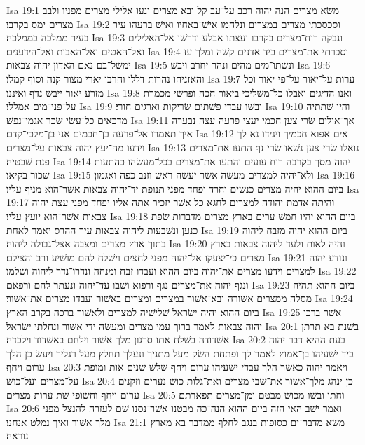 Isa 19:1  משׂא מצרים הנה יהוה רכב על־עב קל ובא מצרים ונעו אלילי מצרים מפניו ולבב מצרים ימס בקרבו׃
Isa 19:2  וסכסכתי מצרים במצרים ונלחמו אישׁ־באחיו ואישׁ ברעהו עיר בעיר ממלכה בממלכה׃
Isa 19:3  ונבקה רוח־מצרים בקרבו ועצתו אבלע ודרשׁו אל־האלילים ואל־האטים ואל־האבות ואל־הידענים׃
Isa 19:4  וסכרתי את־מצרים ביד אדנים קשׁה ומלך עז ימשׁל־בם נאם האדון יהוה צבאות׃
Isa 19:5  ונשׁתו־מים מהים ונהר יחרב ויבשׁ׃
Isa 19:6  והאזניחו נהרות דללו וחרבו יארי מצור קנה וסוף קמלו׃
Isa 19:7  ערות על־יאור על־פי יאור וכל מזרע יאור ייבשׁ נדף ואיננו׃
Isa 19:8  ואנו הדיגים ואבלו כל־משׁליכי ביאור חכה ופרשׂי מכמרת על־פני־מים אמללו׃
Isa 19:9  ובשׁו עבדי פשׁתים שׂריקות וארגים חורי׃
Isa 19:10  והיו שׁתתיה מדכאים כל־עשׂי שׂכר אגמי־נפשׁ׃
Isa 19:11  אך־אולים שׂרי צען חכמי יעצי פרעה עצה נבערה איך תאמרו אל־פרעה בן־חכמים אני בן־מלכי־קדם׃
Isa 19:12  אים אפוא חכמיך ויגידו נא לך וידעו מה־יעץ יהוה צבאות על־מצרים׃
Isa 19:13  נואלו שׂרי צען נשׁאו שׂרי נף התעו את־מצרים פנת שׁבטיה׃
Isa 19:14  יהוה מסך בקרבה רוח עועים והתעו את־מצרים בכל־מעשׂהו כהתעות שׁכור בקיאו׃
Isa 19:15  ולא־יהיה למצרים מעשׂה אשׁר יעשׂה ראשׁ וזנב כפה ואגמון׃
Isa 19:16  ביום ההוא יהיה מצרים כנשׁים וחרד ופחד מפני תנופת יד־יהוה צבאות אשׁר־הוא מניף עליו׃
Isa 19:17  והיתה אדמת יהודה למצרים לחגא כל אשׁר יזכיר אתה אליו יפחד מפני עצת יהוה צבאות אשׁר־הוא יועץ עליו׃
Isa 19:18  ביום ההוא יהיו חמשׁ ערים בארץ מצרים מדברות שׂפת כנען ונשׁבעות ליהוה צבאות עיר ההרס יאמר לאחת׃
Isa 19:19  ביום ההוא יהיה מזבח ליהוה בתוך ארץ מצרים ומצבה אצל־גבולה ליהוה׃
Isa 19:20  והיה לאות ולעד ליהוה צבאות בארץ מצרים כי־יצעקו אל־יהוה מפני לחצים וישׁלח להם מושׁיע ורב והצילם׃
Isa 19:21  ונודע יהוה למצרים וידעו מצרים את־יהוה ביום ההוא ועבדו זבח ומנחה ונדרו־נדר ליהוה ושׁלמו׃
Isa 19:22  ונגף יהוה את־מצרים נגף ורפוא ושׁבו עד־יהוה ונעתר להם ורפאם׃
Isa 19:23  ביום ההוא תהיה מסלה ממצרים אשׁורה ובא־אשׁור במצרים ומצרים באשׁור ועבדו מצרים את־אשׁור׃
Isa 19:24  ביום ההוא יהיה ישׂראל שׁלישׁיה למצרים ולאשׁור ברכה בקרב הארץ׃
Isa 19:25  אשׁר ברכו יהוה צבאות לאמר ברוך עמי מצרים ומעשׂה ידי אשׁור ונחלתי ישׂראל׃
Isa 20:1  בשׁנת בא תרתן אשׁדודה בשׁלח אתו סרגון מלך אשׁור וילחם באשׁדוד וילכדה׃
Isa 20:2  בעת ההיא דבר יהוה ביד ישׁעיהו בן־אמוץ לאמר לך ופתחת השׂק מעל מתניך ונעלך תחלץ מעל רגליך ויעשׂ כן הלך ערום ויחף׃
Isa 20:3  ויאמר יהוה כאשׁר הלך עבדי ישׁעיהו ערום ויחף שׁלשׁ שׁנים אות ומופת על־מצרים ועל־כושׁ׃
Isa 20:4  כן ינהג מלך־אשׁור את־שׁבי מצרים ואת־גלות כושׁ נערים וזקנים ערום ויחף וחשׂופי שׁת ערות מצרים׃
Isa 20:5  וחתו ובשׁו מכושׁ מבטם ומן־מצרים תפארתם׃
Isa 20:6  ואמר ישׁב האי הזה ביום ההוא הנה־כה מבטנו אשׁר־נסנו שׁם לעזרה להנצל מפני מלך אשׁור ואיך נמלט אנחנו׃
Isa 21:1  משׂא מדבר־ים כסופות בנגב לחלף ממדבר בא מארץ נוראה׃
